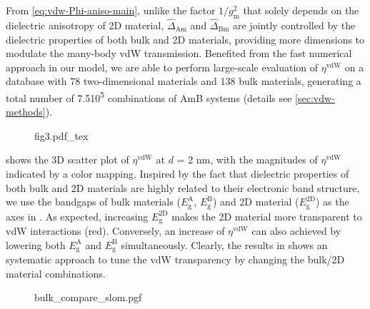 From \autoref{eq:vdw-Phi-aniso-main}, unlike the factor
\(1/g_{\mathrm{m}}^{2}\) that solely depends on the dielectric
anisotropy of 2D material, \(\hat{\Delta}_{\mathrm{Am}}\) and
\(\hat{\Delta}_{\mathrm{Bm}}\) are jointly controlled by the
dielectric properties of both bulk and 2D materials, providing more
dimensions to modulate the many-body vdW transmission.
%
Benefited from
the fast numerical approach in our model, we are able to perform
large-scale evaluation of $\eta^{\mathrm{vdW}}$ on a database with
78 two-dimensional materials and 138 bulk materials, generating a total number of
7.5\texttimes{}10\textsuperscript{5} combinations of AmB systems
(details see \autoref{sec:vdw-methods}).
%
\begin{figure}[h]
  \centering{}
  {fig3.pdf_tex}
  \caption{\label{fig:vdw-database} %
    }
\end{figure}


 shows the 3D scatter plot of
\(\eta^{\mathrm{vdW}}\) at \(d\) = 2 nm, with the magnitudes of
$\eta^{\mathrm{vdW}}$ indicated by a color mapping. Inspired by the
fact that dielectric properties of both bulk \cite{Moss_1950} and 2D
materials  are highly related to their
electronic band structure, we use the bandgaps of bulk materials
(\(E_{\mathrm{g}}^{\mathrm{A}}\), \(E_{\mathrm{g}}^{\mathrm{B}}\)) and
2D material (\(E_{\mathrm{g}}^{\mathrm{2D}}\)) as the axes in
 .
%
As expected, increasing
\(E_{\mathrm{g}}^{\mathrm{2D}}\) makes the 2D material more
transparent to vdW interactions (red).
%
Conversely, an increase of \(\eta^{\mathrm{vdW}}\) can also achieved
by lowering both \(E_{\mathrm{g}}^{\mathrm{A}}\) and
\(E_{\mathrm{g}}^{\mathrm{B}}\) simultaneously.
%
Clearly, the results in  shows an systematic
approach to tune the vdW transparency by changing the bulk/2D material
combinations.


\begin{figure}[h]
  \centering{}
  {bulk_compare_slom.pgf}
  \caption{\label{fig:vdw-compare-slom}}
\end{figure}

